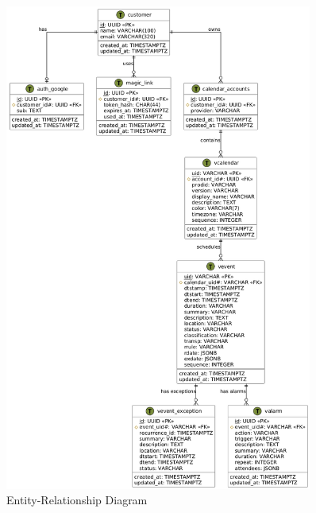 \documentclass[12pt,a4paper,twoside]{report}
\begin{document}
\begin{figure}[!h]
    \centering
    \includegraphics[width=0.9\textwidth]{images/docs/diagrams/er/database/Database Design.png}
    \caption{Entity-Relationship Diagram}
    \label{fig:er-diagram}
\end{figure}
\end{document}
